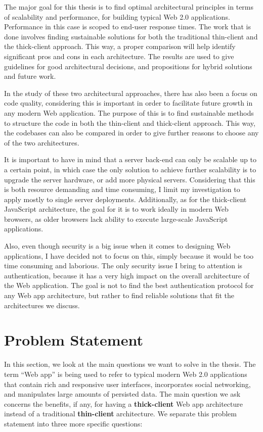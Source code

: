 The major goal for this thesis is to find optimal architectural principles in terms of scalability and performance, for building typical Web 2.0 applications. Performance in this case is scoped to end-user response times. The work that is done involves finding sustainable solutions for both the traditional thin-client and the thick-client approach. This way, a proper comparison will help identify significant pros and cons in each architecture. The results are used to give guidelines for good architectural decisions, and propositions for hybrid solutions and future work.

In the study of these two architectural approaches, there has also been a focus on code quality, considering this is important in order to facilitate future growth in any modern Web application. The purpose of this is to find sustainable methods to structure the code in both the thin-client and thick-client approach. This way, the codebases can also be compared in order to give further reasons to choose any of the two architectures. 
        
It is important to have in mind that a server back-end can only be scalable up to a certain point, in which case the only solution to achieve further scalability is to upgrade the server hardware, or add more physical servers. Considering that this is both resource demanding and time consuming, I limit my investigation to apply mostly to single server deployments. Additionally, as for the thick-client JavaScript architecture, the goal for it is to work ideally in modern Web browsers, as older browsers lack ability to execute large-scale JavaScript applications. 

Also, even though security is a big issue when it comes to designing Web applications, I have decided not to focus on this, simply because it would be too time consuming and laborious. The only security issue I bring to attention is authentication, because it has a very high impact on the overall architecture of the Web application. The goal is not to find the best authentication protocol for any Web app architecture, but rather to find reliable solutions that fit the architectures we discuss. 


\section{Problem Statement}
In this section, we look at the main questions we want to solve in the thesis. The term ``Web app'' is being used to refer to typical modern Web 2.0 applications that contain rich and responsive user interfaces, incorporates social networking, and manipulates large amounts of persisted data. The main question we ask concerns the benefits, if any, for having a \textbf{thick-client} Web app architecture instead of a traditional \textbf{thin-client} architecture. We separate this problem statement into three more specific questions: 

